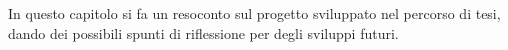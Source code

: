In questo capitolo si fa un resoconto sul progetto sviluppato nel percorso di tesi, dando dei possibili spunti di riflessione
per degli sviluppi futuri.
